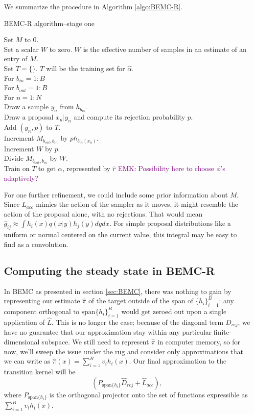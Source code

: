 \documentclass{article}
\newcommand\EMK[1]{\textcolor{purple}{EMK: #1}}
\begin{document}
We summarize the procedure in Algorithm \ref{algo:BEMC-R}.

\begin{algorithm}[h]
\caption{BEMC-R algorithm--stage one \label{algo:BEMC-R}}
Set $M$ to $0$.\\ 
Set a scalar $W$ to zero. $W$ is the effective number of samples in an estimate of an entry of $M$.\\
Set $T = \{\}$. $T$ will be the training set for $\hat{\alpha}$.\\
For $b_{in}  = 1:B$\\
\Indp
For $b_{out}  = 1:B$\\
\Indp
For $n = 1:N$\\
\Indp
Draw a sample $y_n$ from $h_{b_{in}}$.\\
Draw a proposal $x_n|y_n$ and compute its rejection probability $p$.\\
Add $(y_n, p)$ to $T$.\\
Increment $M_{b_{out}, b_{in}}$ by $ph_{b_{in}(x_n)}$.\\
Increment $W$ by $p$.\\
\Indm
Divide $M_{b_{out}, b_{in}}$ by $W$.\\
\Indm
\Indm
Train on $T$ to get $\hat{\alpha}$, represented by $\hat{r}$ \EMK{ Possibility here to choose $\phi$'s adaptively?}\\
\end{algorithm}

For one further refinement, we could include some prior information about $M$. Since $L_{acc}$ mimics the action of the sampler as it moves, it might resemble the action of the proposal alone, with no rejections. That would mean $\hat{g}_{ij} \approx \int h_i(x)q(x|y)h_j(y)dydx$. For simple proposal distributions like a uniform or normal centered on the current value, this integral may be easy to find as a convolution.

\subsection{Computing the steady state in BEMC-R}
\label{BEMC-R-target}


In BEMC as presented in section \ref{sec:BEMC}, there was nothing to gain by representing our estimate $\hat{\pi}$ of the target outside of the span of $\{h_i\}_{i=1}^B$: any component orthogonal to $\text{span}\{h_i\}_{i=1}^B$ would get zeroed out upon a single application of $\hat{L}$. This is no longer the case; because of the diagonal term $D_{rej}$, we have no guarantee that our approximation stay within any particular finite-dimensional subspace. We still need to represent $\hat{\pi}$ in computer memory, so for now, we'll sweep the issue under the rug and consider only approximations that we can write as $\hat{\pi}(x) = \sum_{i=1}^{B}v_{i}h_i(x)$. Our final approximation to the transition kernel will be $$ (P_{\text{span}\{h_i\}}\hat{D}_{rej} + 
\hat{L}_{acc}),$$ where $P_{\text{span}\{h_i\}}$ is the orthogonal projector onto the set of functions expressible as $\sum_{i=1}^{B}v_{i}h_i(x)$.
\end{document}
